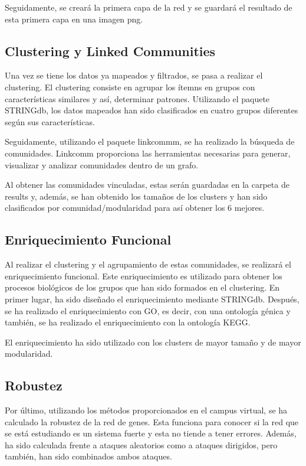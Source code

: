 Seguidamente, se creará la primera capa de la red y se guardará el resultado de esta primera capa en una imagen png. 

\subsection{Clustering y Linked Communities}
Una vez se tiene los datos ya mapeados y filtrados, se pasa a realizar el clustering. El clustering consiste en agrupar los ítemns en grupos con características similares y así, determinar patrones.
Utilizando el paquete STRINGdb, los datos mapeados han sido clasificados en cuatro grupos diferentes según sus características.

Seguidamente, utilizando el paquete linkcommm, se ha realizado la búsqueda de comunidades. Linkcomm proporciona las herramientas necesarias para generar, visualizar y analizar comunidades dentro de un grafo.

Al obtener las comunidades vinculadas, estas serán guardadas en la carpeta de results y, además, se han obtenido los tamaños de los clusters y han sido clasificados por comunidad/modularidad para así obtener los 6 mejores.

\subsection{Enriquecimiento Funcional}
Al realizar el clustering y el agrupamiento de estas comunidades, se realizará el enriquecimiento funcional. Este enriquecimiento es utilizado para obtener los procesos biológicos de los grupos que han sido formados en el clustering.
En primer lugar, ha sido diseñado el enriquecimiento mediante STRINGdb. Después, se ha realizado el enriquecimiento con GO, es decir, con una ontología génica y también, se ha realizado el enriquecimiento con la ontología KEGG. 

El enriquecimiento ha sido utilizado con los clusters de mayor tamaño y de mayor modularidad.

\subsection{Robustez}
Por último, utilizando los métodos proporcionados en el campus virtual, se ha calculado la robustez de la red de genes. Esta funciona para conocer si la red que se está estudiando es un sistema fuerte y esta no tiende a tener errores. Además, ha sido calculada frente a ataques aleatorios como a ataques dirigidos, pero también, han sido combinados ambos ataques.

 